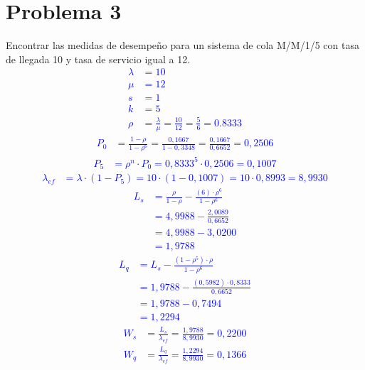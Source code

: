 \documentclass{templateNote}
\begin{document}
\section{Problema 3}
Encontrar las medidas de desempeño para un sistema de cola M/M/1/5 con tasa de llegada 10 y tasa de servicio igual a 12.
\textcolor{blue}{
    \begin{align*}
        \lambda &= 10 \\
        \mu &= 12 \\
        s &= 1 \\
        k &= 5 \\
        \rho &= \frac{\lambda}{\mu} = \frac{10}{12} = \frac{5}{6} = 0.8333
    \end{align*}
    \begin{align*}
        P_0 &= \frac{1 - \rho}{1 - \rho^{6}} = \frac{0,1667}{1 - 0,3348} = \frac{0,1667}{0,6652} = 0,2506
    \end{align*}
    \begin{align*}
        P_5 &= \rho^n \cdot P_0 = 0,8333^5 \cdot 0,2506 = 0,1007
    \end{align*}
    \begin{align*}
        \lambda_{ef} &= \lambda \cdot (1 - P_5) = 10 \cdot (1 - 0,1007) = 10 \cdot 0,8993 = 8,9930
    \end{align*}
    \begin{align*}
        L_s &= \frac{\rho}{1 - \rho} - \frac{(6) \cdot \rho^6}{1 - \rho^6} \\
        &= 4,9988 - \frac{2,0089}{0,6652} \\
        &= 4,9988 - 3,0200 \\
        &= 1,9788
    \end{align*}
    \begin{align*}
        L_q &= L_s - \frac{(1 - \rho^5) \cdot \rho}{1 - \rho^6} \\
        &= 1,9788 - \frac{(0,5982) \cdot 0,8333}{0,6652} \\
        &= 1,9788 - 0,7494 \\
        &= 1,2294
    \end{align*}
    \begin{align*}
        W_s &= \frac{L_s}{\lambda_{ef}} = \frac{1,9788}{8,9930} = 0,2200
    \end{align*}
    \begin{align*}
        W_q &= \frac{L_q}{\lambda_{ef}} = \frac{1,2294}{8,9930} = 0,1366
    \end{align*}
}
\newpage
\end{document}
